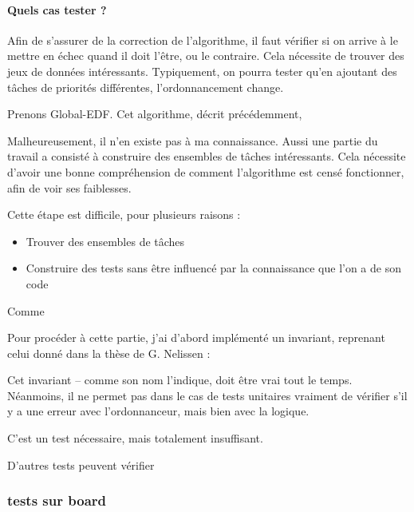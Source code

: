 	\paragraph{Quels cas tester ?}
	Afin de s'assurer de la correction de l'algorithme, il faut vérifier si on arrive à le mettre en échec quand 
	il doit l'être, ou le contraire. Cela nécessite de trouver des jeux de données intéressants. 
	Typiquement, on pourra tester qu'en ajoutant des tâches de priorités différentes, 
	l'ordonnancement change. 
	
	Prenons Global-EDF. Cet algorithme, décrit précédemment, 
	
	
	
	Malheureusement, il n'en existe pas à ma connaissance. Aussi une partie du travail a consisté 
	à construire des ensembles de tâches intéressants. Cela nécessite d'avoir une bonne 
	compréhension de comment l'algorithme est censé fonctionner, afin de voir ses faiblesses.
	
	Cette étape est difficile, pour plusieurs raisons :
	\begin{itemize}
		\item Trouver des ensembles de tâches
		\item Construire des tests sans être influencé par la connaissance que l'on a de son code
	\end{itemize}
	
	
	Comme 
	
	
	Pour procéder à cette partie, j'ai d'abord implémenté un invariant, reprenant celui donné dans la 
	thèse de G. Nelissen : 
	
	
	Cet invariant -- comme son nom l'indique, doit être vrai tout le temps. Néanmoins, il ne permet pas 
	dans le cas de tests unitaires vraiment de vérifier s'il y a une erreur avec l'ordonnanceur, mais bien avec 
	la logique.
	
	C'est un test nécessaire, mais totalement insuffisant.
	
	D'autres tests peuvent vérifier 
	
	
	
		
	\subsubsection{tests sur board}	
	
	

